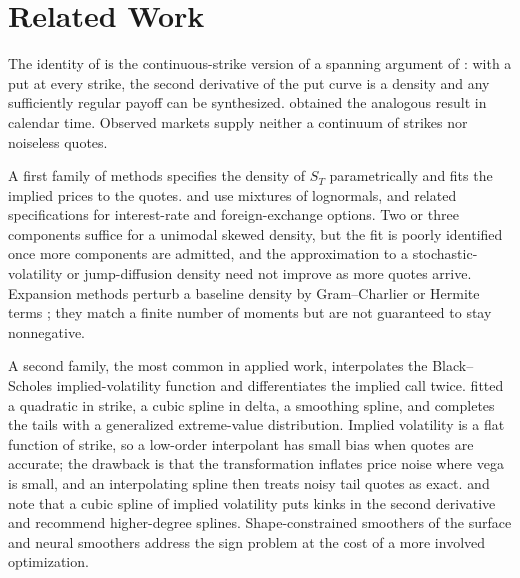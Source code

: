 \documentclass[preprint,12pt,authoryear,times]{elsarticle}
\begin{document}
\section{Related Work}
\label{sec:lit}

The identity of \citet{breeden1978} is the continuous-strike version of a spanning argument of \citet{ross1976}: with a put at every strike, the second derivative of the put curve is a density and any sufficiently regular payoff can be synthesized. \citet{dupire1994} obtained the analogous result in calendar time. Observed markets supply neither a continuum of strikes nor noiseless quotes.

A first family of methods specifies the density of \(S_T\) parametrically and fits the implied prices to the quotes. \citet{ritchey1990} and \citet{melick1997} use mixtures of lognormals, \citet{bahra1997} and \citet{soderlind1997} related specifications for interest-rate and foreign-exchange options. Two or three components suffice for a unimodal skewed density, but the fit is poorly identified once more components are admitted, and the approximation to a stochastic-volatility or jump-diffusion density need not improve as more quotes arrive. Expansion methods perturb a baseline density by Gram--Charlier or Hermite terms \citep{jarrowrudd1982,corradosu1996,rompolis2007,xiu2014}; they match a finite number of moments but are not guaranteed to stay nonnegative.

A second family, the most common in applied work, interpolates the Black--Scholes implied-volatility function and differentiates the implied call twice. \citet{shimko1993} fitted a quadratic in strike, \citet{malz1997} a cubic spline in delta, \citet{bliss2002} a smoothing spline, and \citet{figlewski2010} completes the tails with a generalized extreme-value distribution. Implied volatility is a flat function of strike, so a low-order interpolant has small bias when quotes are accurate; the drawback is that the transformation inflates price noise where vega is small, and an interpolating spline then treats noisy tail quotes as exact. \citet{jackwerth2004} and \citet{figlewski2018} note that a cubic spline of implied volatility puts kinks in the second derivative and recommend higher-degree splines. Shape-constrained smoothers of the surface \citep{fengler2005,fengler2009,gatheraljacquier2014,ludwig2015} and neural smoothers \citep{ackerer2020} address the sign problem at the cost of a more involved optimization.
\end{document}

